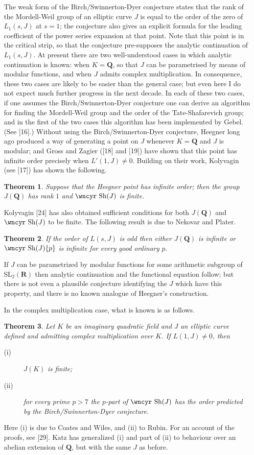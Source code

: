 \documentclass[12pt]{article}
\def\bQ{{\mathbf Q}}
\def\bR{{\mathbf R}}
\def\Sha{\mbox{\wncyr Sh}}
\def\bth{\begin{theorem} \label}
\def\eth{\end{theorem}}
\newtheorem{theorem}{Theorem}
\begin{document}
The weak form of the Birch/Swinnerton-Dyer conjecture states that the rank of
the Mordell-Weil group of an elliptic curve $J$
is equal to the order of the zero of $L_1(s,J)$ at $s=1$; the conjecture
also gives an explicit formula for the leading coefficient of the power series
expansion at that point. Note that this point is in the critical strip, so
that the conjecture pre-supposes the analytic continuation of $L_1(s,J)$.
At present there are two well-understood 
cases in which analytic continuation is known: when
$K=\bQ$, so that $J$ can be parametrised by means of modular functions, and
when $J$ admits complex multiplication. In consequence, these two cases are
likely to be easier than the general case; but even here I do not expect much
further progress in the next decade. In each of these two cases, if one
assumes the Birch/Swinnerton-Dyer conjecture one can derive an algorithm for
finding the Mordell-Weil group and the order of the Tate-Shafarevich group;
and in the first of the two cases this algorithm has been implemented by
Gebel. (See [16].) Without using the Birch/Swinnerton-Dyer conjecture,
Heegner long ago produced a way of generating a point on $J$ whenever $K=\bQ$
and $J$ is modular; and Gross
and Zagier ([18] and [19]) have shown that this point has infinite order
precisely when $L'(1,J)\neq0$. Building on their work, Kolyvagin (see [17])
has shown the following.
\bth{T5} Suppose that the Heegner point has infinite order; then the group
$J(\bQ)$ has rank $1$ and $\Sha(J)$ is finite.
\eth
Kolyvagin [24] has also obtained sufficient conditions for both $J(\bQ)$ and
$\Sha(J)$ to be finite. The following result is due to Nekovar and Plater.
\bth{T6} If the order of $L(s,J)$ is odd then either $J(\bQ)$ is infinite or
$\Sha(J)\{p\}$ is infinite for every good ordinary $p$.
\eth
If $J$ can be parametrized by modular
functions for some arithmetic subgroup of SL$_2(\bR)$ then analytic
continuation and the functional equation follow; but there is not even a
plausible conjecture identifying the $J$ which have this property, and there
is no known analogue of Heegner's construction.

In the complex multiplication case, what is
known is as follows.
\bth{T2} Let $K$ be an imaginary quadratic field and $J$ an elliptic curve
defined and admitting complex multiplication over $K$. If $L(1,J)\neq0$, then
\begin{description}
\item[(i)] $J(K)$ is finite;
\item[(ii)] for every prime $p>7$ the $p$-part of $\Sha(J)$
has the order predicted by the Birch/Swinnerton-Dyer conjecture.
\end{description}
\eth
Here (i) is due to Coates and Wiles, and (ii) to Rubin. For an account of the
proofs, see [29]. Katz has generalized (i) and part of (ii) to behaviour over
an abelian extension of $\bQ$, but with the same $J$ as before.
\end{document}
